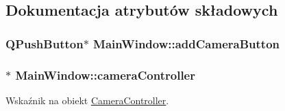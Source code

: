 \subsection{Dokumentacja atrybutów składowych}
\hypertarget{class_main_window_a57be70fafedbc093231447e86720672f}{
\subsubsection[{add\-Camera\-Button}]{\setlength{\rightskip}{0pt plus 5cm}Q\-Push\-Button$\ast$ Main\-Window\-::add\-Camera\-Button\hspace{0.3cm}{\ttfamily [protected]}}}\label{class_main_window_a57be70fafedbc093231447e86720672f}
\hypertarget{class_main_window_a5db1869c49b5f061ee85f0843ba7d6f9}{
\subsubsection[{camera\-Controller}]{$\ast$ Main\-Window\-::camera\-Controller}}\label{class_main_window_a5db1869c49b5f061ee85f0843ba7d6f9}


Wskaźnik na obiekt \hyperlink{class_camera_controller}{Camera\-Controller}. 

